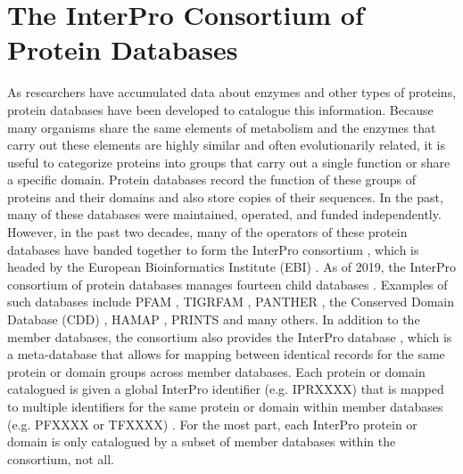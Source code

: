 \section{The InterPro Consortium of Protein Databases}

As researchers have accumulated data about enzymes and other types of proteins, protein databases have been developed to catalogue this information. Because many organisms share the same elements of metabolism and the enzymes that carry out these elements are highly similar and often evolutionarily related, it is useful to categorize proteins into groups that carry out a single function or share a specific domain. Protein databases record the function of these groups of proteins and their domains and also store copies of their sequences. In the past, many of these databases were maintained, operated, and funded independently. However, in the past two decades, many of the operators of these protein databases have banded together to form the InterPro consortium \cite{apweiler2000interpro,hunter2008interpro,Hunter2009}, which is headed by the European Bioinformatics Institute (EBI) \cite{cook2015european,finn2016interpro}. As of 2019, the InterPro consortium of protein databases manages fourteen child databases \cite{finn2016interpro,Hunter2009}. Examples of such databases include PFAM \cite{bateman2004pfam}, TIGRFAM \cite{Haft2013}, PANTHER \cite{mi2005panther}, the Conserved Domain Database (CDD) \cite{marchler2014cdd}, HAMAP \cite{lima2008hamap}, PRINTS \cite{attwood2000prints} and many others. In addition to the member databases, the consortium also provides the InterPro database \cite{hunter2008interpro,finn2016interpro}, which is a meta-database that allows for mapping between identical records for the same protein or domain groups across member databases. Each protein or domain catalogued is given a global InterPro identifier (e.g. IPRXXXX) that is mapped to multiple identifiers for the same protein or domain within member databases (e.g. PFXXXX or TFXXXX) \cite{hunter2008interpro,finn2016interpro}. For the most part, each InterPro protein or domain is only catalogued by a subset of member databases within the consortium, not all.

